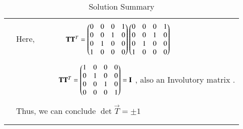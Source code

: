 \documentclass[journal,12pt]{IEEEtran}
\begin{document}
\begin{longtable}{|p{5cm}|p{13cm}|}
	&\\
	& Here, $\qquad\qquad\mathbf{T}\mathbf{T}^{T}=\begin{pmatrix}0&0&0&1\\0&0&1&0\\0&1&0&0\\1&0&0&0\end{pmatrix}\begin{pmatrix}0&0&0&1\\0&0&1&0\\0&1&0&0\\1&0&0&0\end{pmatrix}$\\
	&\\
	&$\qquad\qquad\qquad\mathbf{T}\mathbf{T}^{T}=\begin{pmatrix}1&0&0&0\\0&1&0&0\\0&0&1&0\\0&0&0&1\end{pmatrix} = \mathbf{I}$ , also an Involutory matrix .\\
	&\\
	& Thus, we can conclude $\det{\vec{T}}=\pm1$\\
	&\\
	\hline
	\caption{Solution Summary}
    \label{table:2}
\end{longtable}
\end{document}
